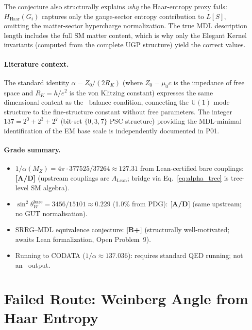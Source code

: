 \documentclass[11pt]{article}
\theoremstyle{remark}
\newcommand{\SRRG}{\text{SRRG}}
\begin{document}
\begin{appendices}
The conjecture also structurally explains \emph{why} the Haar-entropy proxy fails:
$H_{\mathrm{Haar}}(G_i)$ captures only the gauge-sector entropy contribution to
$L[S]$, omitting the matter-sector hypercharge normalization.  The true MDL
description length includes the full SM matter content, which is why only the
Elegant Kernel invariants (computed from the complete UGP structure) yield the
correct values.

\paragraph{Literature context.}
The standard identity $\alpha = Z_0/(2R_K)$ (where $Z_0 = \mu_0 c$ is the impedance of
free space and $R_K = h/e^2$ is the von Klitzing constant) expresses the same
dimensional content as the \SRRG\ balance condition, connecting the $\mathrm{U}(1)$
mode structure to the fine-structure constant without free parameters.
The integer $137 = 2^0 + 2^3 + 2^7$
(bit-set $\{0,3,7\}$ PSC structure) providing the MDL-minimal identification of
the EM base scale is independently documented in P01.

\paragraph{Grade summary.}
\begin{itemize}[leftmargin=2.5em]
  \item $1/\alpha(M_Z) = 4\pi \cdot 377525/37264 \approx 127.31$ from Lean-certified
    bare couplings: \textbf{[A/D]} (upstream couplings are $A_{\mathrm{Lean}}$;
    bridge via Eq.~\eqref{eq:alpha_tree} is tree-level SM algebra).
  \item $\sin^2\theta_W^{\mathrm{bare}} = 3456/15101 \approx 0.229$ (1.0\% from PDG):
    \textbf{[A/D]} (same upstream; no GUT normalisation).
  \item SRRG--MDL equivalence conjecture: \textbf{[B+]} (structurally well-motivated;
    awaits Lean formalization, Open Problem~9).
  \item Running to CODATA ($1/\alpha \approx 137.036$): requires standard QED
    running; not an \SRRG\ output.
\end{itemize}

\section{Failed Route: Weinberg Angle from Haar Entropy}
\label{app:weinberg}


\end{appendices}
\end{document}
